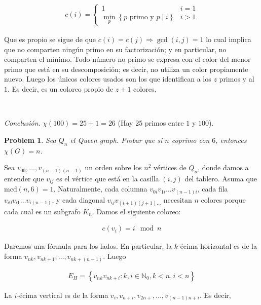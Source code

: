 \documentclass[a4paper]{article}
\newtheorem{problem}{Problem}
\newtheorem{problem}{Problem}
\begin{document}
\begin{align*}
    c(i) = \begin{cases}
        1 & i = 1 \\ 
        \min_{p} \left\{ p \text{ primo  y } p \mid i  \right\}  & i > 1
    \end{cases}
\end{align*}

Que es propio se sigue de que $c(i) = c(j) \Rightarrow \gcd(i, j) = 1$ lo cual
implica que no comparten ningún primo en su factorización; y en particular, no
comparten el mínimo. Todo número no primo se expresa con el color del menor
primo que está en su descomposición; es decir, no utiliza un color propiamente
nuevo. Luego los únicos colores usados son los que identifican a los $z$ primos
y al $1$. Es decir, es un coloreo propio de $z + 1$ colores. 

~ 

\textit{Conclusión}. $\chi(100) = 25 + 1 = 26$ (Hay 25 primos entre $1$ y
$100$).

\pagebreak

\begin{problem}
    Sea $Q_n$ el Queen graph. Probar que si $n$ coprimo con $6$, entonces
    $\chi(G) = n$.
\end{problem}

Sea $v_{00}, \ldots, v_{(n-1)(n-1)}$ un orden sobre los $n^2$ vértices de $Q_n$,
donde damos a entender que $v_{ij}$ es el vértice que está en la casilla $(i,
j)$ del tablero. Asuma que $\text{mcd}(n, 6) = 1$. Naturalmente, cada columna
$v_{0i}v_{1i}\ldots v_{(n-1)i}$, cada fila $v_{i 0}v_{i 1}\ldots v_{i (n - 1)}$,
y cada diagonal $v_{ij}v_{(i+1)(j+1) \ldots}$ necesitan $n$ colores porque
cada cual es un subgrafo $K_n$. Damos el siguiente coloreo: 

\begin{align*}
    c(v_i) = i \mod n
\end{align*}




Daremos una
fórmula para los lados. En particular, la $k$-écima horizontal es de la forma
$v_{nk}, v_{nk+1}, \ldots, v_{nk + (n -1)}$. Luego

\begin{align*}
    E_{H} = \left\{ v_{nk} v_{nk + i} : k, i \in  \mathbb{N}_0, k < n, i < n \right\}  
\end{align*}

La $i$-écima vertical es de la forma $v_{i}, v_{n + i}, v_{2n + }, \ldots,
v_{(n - 1)n + i}$. Es decir, 
\end{document}
